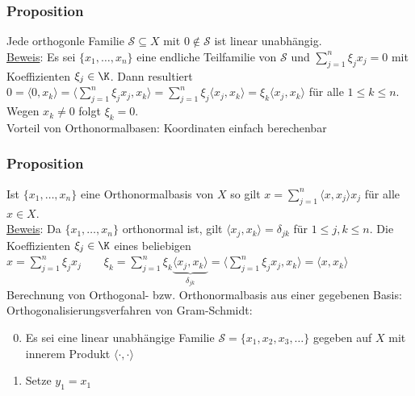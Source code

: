 \subsubsection{Proposition}
Jede orthogonle Familie $\mathcal{S}\subseteq X$ mit $0\notin\mathcal{S}$ ist linear unabhängig.\\
\underline{Beweis}: Es sei $\{x_1,\dots,x_n\}$ eine endliche Teilfamilie von $\mathcal{S}$ und $\sum_{j=1}^n \xi_j x_j =0$ mit Koeffizienten $\xi_j\in\K$.
Dann resultiert $0=\langle 0,x_k\rangle=\langle\sum_{j=1}^n\xi_j x_j,x_k\rangle=\sum_{j=1}^n \xi_j \langle x_j,x_k\rangle=\xi_k\langle x_j,x_k\rangle$ für alle $1\leq k\leq n$. Wegen $x_k\neq 0$ folgt $\xi_k=0$.\\
Vorteil von Orthonormalbasen: Koordinaten einfach berechenbar
\subsubsection{Proposition}
Ist $\{x_1,\dots,x_n\}$ eine Orthonormalbasis von $X$ so gilt $x=\sum_{j=1}^n \langle x,x_j\rangle x_j$ für alle $x\in X$.\\
\underline{Beweis}: Da $\{x_1,\dots,x_n\}$ orthonormal ist, gilt $\langle x_j,x_k\rangle=\delta_{jk}$ für $1\leq j,k\leq n$. Die Koeffizienten $\xi_j\in\K$ eines beliebigen $x=\sum_{j=1}^n\xi_j x_j \qquad \xi_k=\sum_{j=1}^n\xi_k \underbrace{\langle x_j,x_k\rangle}_{\delta_{jk}}=\langle\sum_{j=1}^n\xi_j x_j,x_k\rangle=\langle x,x_k\rangle$\\
Berechnung von Orthogonal- bzw. Orthonormalbasis aus einer gegebenen Basis: Orthogonalisierungsverfahren von Gram-Schmidt:

\numbers
\begin{enumerate}
\setcounter{enumi}{-1}
\item Es sei eine linear unabhängige Familie $\mathcal{S}=\{x_1,x_2,x_3,\dots\}$ gegeben auf $X$ mit innerem Produkt $\langle \cdot,\cdot\rangle$
\item Setze $y_1=x_1$
\end{enumerate}
